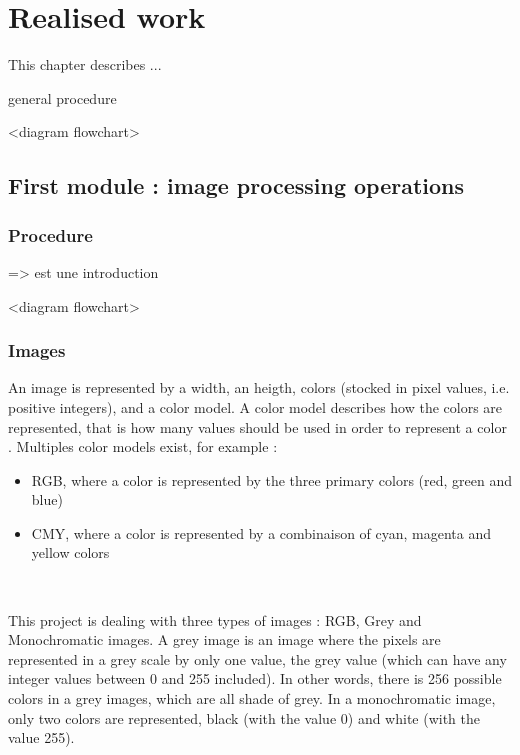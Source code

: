 \chapter{Realised work}


This chapter describes ...

general procedure 

<diagram flowchart>


\section{First module : image processing operations}


\subsection{Procedure}

=> est une introduction 

<diagram flowchart>


\subsection{Images}

An image is represented by a width, an heigth, colors (stocked in pixel values, i.e. positive integers), and a color model. A color model describes how the colors are represented, that is how many values should be used in order to represent a color \cite{bib:image:ColorModel}. Multiples color models exist, for example : 
\begin{itemize}
	\item RGB, where a color is represented by the three primary colors (red, green and blue)
	\item CMY, where a color is represented by a combinaison of cyan, magenta and yellow colors
\end{itemize}


~~

This project is dealing with three types of images : RGB, Grey and Monochromatic images. A grey image is an image where the pixels are represented in a grey scale by only one value, the grey value (which can have any integer values between 0 and 255 included). In other words, there is 256 possible colors in a grey images, which are all shade of grey. In a monochromatic image, only two colors are represented, black (with the value 0) and white (with the value 255).

~~

